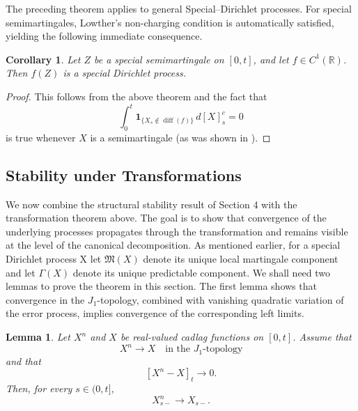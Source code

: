 \documentclass[a4paper,10pt]{article}
\newtheorem{lemma}[thm]{Lemma}
\newtheorem{corollary}[thm]{Corollary}
\begin{document}
The preceding theorem applies to general Special--Dirichlet
processes. For special semimartingales, Lowther's non-charging
condition is automatically satisfied, yielding the following
immediate consequence.

\begin{corollary}
Let \(Z\) be a special semimartingale on \([0,t]\), and let \(f \in C^1(\mathbb{R})\).
Then \(f(Z)\) is a special Dirichlet process.
\end{corollary}
\begin{proof}
This follows from the above theorem and the fact that 
\[
        \int_0^t
        \mathbf 1_{\{X_s\notin\operatorname{diff}(f)\}}\,d[X]^c_s=0
\]
is true whenever $X$ is a semimartingale (as was shown in \cite{Low}).
\end{proof}




\subsection{Stability under Transformations}
We now combine the structural stability result of Section 4 with the
transformation theorem above. The goal is to show that convergence of
the underlying processes propagates through the transformation and
remains visible at the level of the canonical decomposition.
As mentioned earlier, for a special Dirichlet process X let $\mathfrak{M}(X)$ denote its unique local martingale component and let $\mathfrak{\Gamma}(X)$ denote its unique predictable component. We shall need two lemmas to prove the theorem in this section. The first lemma shows that convergence in the \(J_1\)-topology,
combined with vanishing quadratic variation of the error process,
implies convergence of the corresponding left limits.




\begin{lemma}\label{lem:QVJ1}
Let \(X^n\) and \(X\) be real-valued cadlag functions on \([0,t]\).
Assume that
\[
        X^n \to X
        \quad\text{in the } J_1\text{-topology}
\]
and that
\[
        [X^n-X]_t \to 0 .
\]
Then, for every \(s\in(0,t]\),
\[
        X^n_{s-}\to X_{s-}.
\]
\end{lemma}
\end{document}
